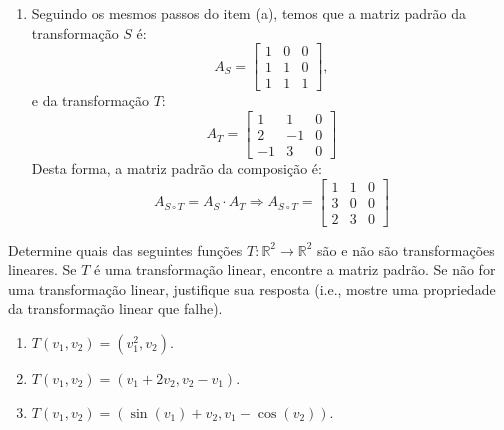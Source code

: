 \begin{resolution}
\begin{enumerate}[label=\alph*)]
    \item Seguindo os mesmos passos do item (a), temos que a matriz padrão da transformação $S$ é:
          \begin{equation}
            A_S = \begin{bmatrix}
              1 & 0 & 0 \\
              1 & 1 & 0 \\
              1 & 1 & 1
            \end{bmatrix},
          \end{equation}
          e da transformação $T$:
          \begin{equation}
            A_T = \begin{bmatrix}
              1  & 1  & 0 \\
              2  & -1 & 0 \\
              -1 & 3  & 0
            \end{bmatrix}
          \end{equation}
          Desta forma, a matriz padrão da composição é:
          \begin{equation}
            A_{S \circ T} = A_S \cdot A_T \Rightarrow A_{S \circ T} = \begin{bmatrix}
              1 & 1 & 0 \\ 3 & 0 & 0 \\ 2 & 3 & 0
            \end{bmatrix}
          \end{equation}
  \end{enumerate}
\end{resolution}

\begin{question}
  Determine quais das seguintes funções $T: \mathbb{R}^2 \rightarrow \mathbb{R}^2$ são e não são transformações lineares. Se $T$ é uma transformação linear, encontre a matriz padrão. Se não for uma transformação linear, justifique sua resposta (i.e., mostre uma propriedade da transformação linear que falhe).
  \begin{enumerate}[label=\alph*)]
    \item $T(v_1, v_2) = (v_1^2, v_2)$.
    \item $T(v_1, v_2) = (v_1 + 2v_2, v_2 - v_1)$.
    \item $T(v_1, v_2) = (\sin(v_1) + v_2, v_1 - \cos(v_2))$.
  \end{enumerate}
\end{question}

